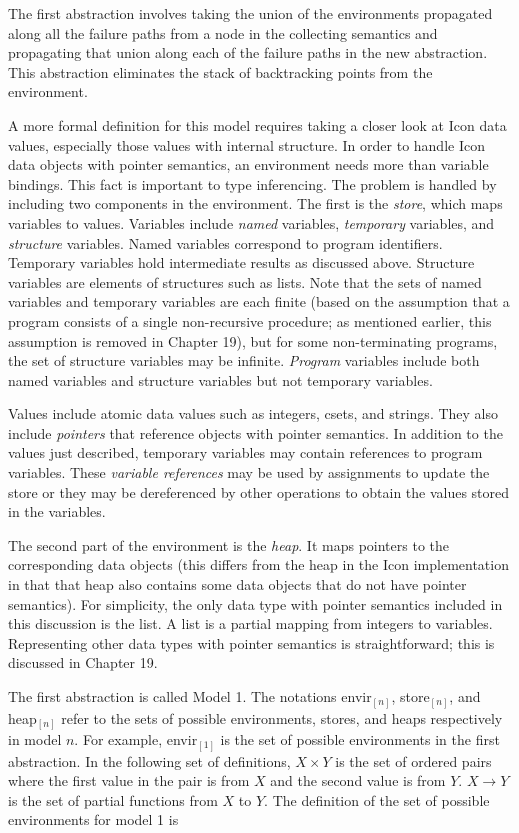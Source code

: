 The first abstraction involves taking the union of the environments
propagated along all the failure paths from a node in the collecting
semantics and propagating that union along each of the failure paths
in the new abstraction. This abstraction eliminates the stack of
backtracking points from the environment.

A more formal definition for this model requires taking a closer look
at Icon data values, especially those values with internal
structure. In order to handle Icon data objects with pointer
semantics, an environment needs more than variable bindings. This fact
is important to type inferencing. The problem is handled by including
two components in the environment. The first is the \textit{store},
which maps variables to values. Variables include \textit{named}
variables, \textit{temporary} variables, and \textit{structure}
variables. Named variables correspond to program
identifiers. Temporary variables hold intermediate results as
discussed above. Structure variables are elements of structures such
as lists. Note that the sets of named variables and temporary
variables are each finite (based on the assumption that a program
consists of a single non-recursive procedure; as mentioned earlier,
this assumption is removed in Chapter 19), but for some
non-terminating programs, the set of structure variables may be
infinite.  \textit{Program} variables include both named variables and
structure variables but not temporary variables.

Values include atomic data values such as integers, csets, and
strings. They also include \textit{pointers} that reference objects
with pointer semantics. In addition to the values just described,
temporary variables may contain references to program variables. These
\textit{variable references} may be used by assignments to update the
store or they may be dereferenced by other operations to obtain the
values stored in the variables.

The second part of the environment is the \textit{heap}. It maps
pointers to the corresponding data objects (this differs from the heap
in the Icon implementation in that that heap also contains some data
objects that do not have pointer semantics). For simplicity, the only
data type with pointer semantics included in this discussion is the
list.  A list is a partial mapping from integers to
variables. Representing other data types with pointer semantics is
straightforward; this is discussed in Chapter 19.

The first abstraction is called Model 1. The notations envir$_{[n]}$,
store$_{[n]}$, and heap$_{[n]}$ refer to the sets of possible
environments, stores, and heaps respectively in model $n$. For
example, envir$_{[1]}$ is the set of possible environments in the
first abstraction. In the following set of definitions, $X \times Y$
is the set of ordered pairs where the first value in the pair is from
$X$ and the second value is from $Y$. $ X \rightarrow Y$ is the set of
partial functions from $X$ to $Y$. The definition of the set of
possible environments for model 1 is

